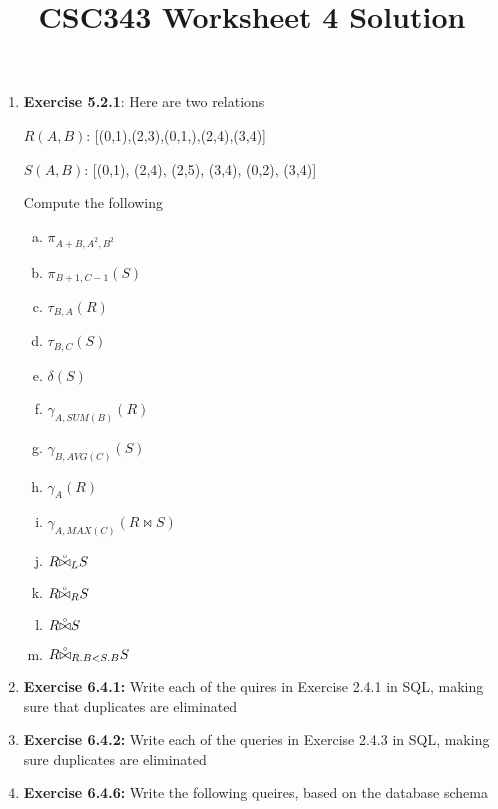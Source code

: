 \documentclass[12pt]{article}
\begin{document}
\title{CSC343 Worksheet 4 Solution}
\maketitle

\bigskip

\begin{enumerate}[1.]
    \item \textbf{Exercise 5.2.1}: Here are two relations

    \bigskip

    $R(A,B)$: [(0,1),(2,3),(0,1,),(2,4),(3,4)]

    \bigskip

    $S(A,B)$: [(0,1), (2,4), (2,5), (3,4), (0,2), (3,4)]

    \bigskip

    Compute the following

    \begin{enumerate}[a)]
        \item $\pi_{A+B,A^2,B^2}$
        \item $\pi_{B+1,C-1}(S)$
        \item $\tau_{B,A}(R)$
        \item $\tau_{B,C}(S)$
        \item $\delta(S)$
        \item $\gamma_{A, SUM(B)}(R)$
        \item $\gamma_{B, AVG(C)}(S)$
        \item $\gamma_A(R)$
        \item $\gamma_{A, MAX(C)}(R \bowtie S)$
        \item $R \accentset{\circ}{\bowtie}_L S$
        \item $R \accentset{\circ}{\bowtie}_R S$
        \item $R \accentset{\circ}{\bowtie} S$
        \item $R \accentset{\circ}{\bowtie}_{R.B < S.B} S$
    \end{enumerate}

    \item \textbf{Exercise 6.4.1:} Write each of the quires in Exercise 2.4.1 in SQL,
    making sure that duplicates are eliminated

    \item \textbf{Exercise 6.4.2:} Write each of the queries in Exercise 2.4.3 in
    SQL, making sure duplicates are eliminated

    \item \textbf{Exercise 6.4.6:} Write the following queires, based on the database
    schema


\end{enumerate}
\end{document}
